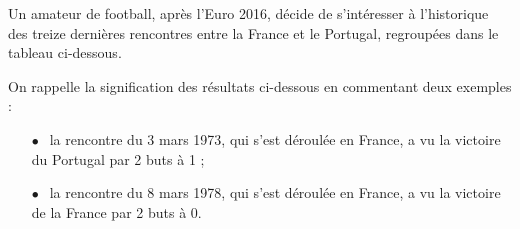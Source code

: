 \documentclass[10pt]{article}
\begin{document}
\setlength\parindent{0mm}
\pagestyle{fancy}
\thispagestyle{empty}
    
    
    




\medskip

Un amateur de football, après l'Euro 2016, décide de s'intéresser à l'historique des
treize dernières rencontres entre la France et le Portugal, regroupées dans le tableau
ci-dessous.

On rappelle la signification des résultats ci-dessous en commentant deux exemples :

\setlength\parindent{6mm}
\begin{itemize}
\item[$\bullet~~$]la rencontre du 3 mars 1973, qui s'est déroulée en France, a vu la victoire du Portugal par 2 buts à 1 ;
\item[$\bullet~~$]la rencontre du 8 mars 1978, qui s'est déroulée en France, a vu la victoire de la France par 2 buts à 0.
\end{itemize}
\setlength\parindent{0mm}
\end{document}
